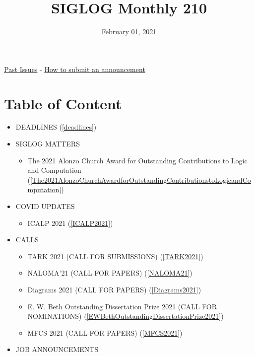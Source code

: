 \documentclass{article}
\begin{document}
\title{SIGLOG Monthly 210}\date{February 01, 2021}\maketitle


\href{https://lics.siglog.org/newsletters/}{Past Issues}
 - 
\href{https://lics.siglog.org/newsletters/inst.html}{How to submit an announcement}
\section{Table of Content}\begin{itemize}\item DEADLINES (\cref{deadlines}) 
 
\item SIGLOG MATTERS 
 
\begin{itemize}\item The 2021 Alonzo Church Award for Outstanding Contributions to Logic and Computation (\cref{The2021AlonzoChurchAwardforOutstandingContributionstoLogicandComputation})
\end{itemize} 
\item COVID UPDATES 
 
\begin{itemize}\item ICALP 2021 (\cref{ICALP2021})
\end{itemize} 
\item CALLS 
 
\begin{itemize}\item TARK 2021 (CALL FOR SUBMISSIONS) (\cref{TARK2021})
\item NALOMA'21 (CALL FOR PAPERS) (\cref{NALOMA21})
\item Diagrams 2021 (CALL FOR PAPERS) (\cref{Diagrams2021})
\item E. W. Beth Outstanding Dissertation Prize 2021 (CALL FOR NOMINATIONS) (\cref{EWBethOutstandingDissertationPrize2021})
\item MFCS 2021 (CALL FOR PAPERS) (\cref{MFCS2021})
\end{itemize} 
\item JOB ANNOUNCEMENTS 
 

\end{itemize}
\end{document}
